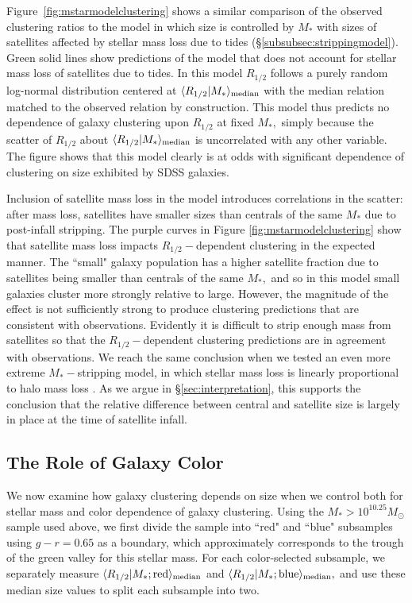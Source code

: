 \documentclass[usenatbib,usegraphicx,letterpaper]{mn2e}
\newcommand{\rhalf}{R_{1/2}}
\newcommand{\mstar}{M_{\ast}}
\newcommand{\median}[2]{\langle{#1}\vert{#2}\rangle_{\rm median}}
\newcommand{\msun}{M_\odot}
\begin{document}
Figure~\ref{fig:mstarmodelclustering} shows a similar comparison of the observed clustering ratios to the model
in which size is controlled by $\mstar$ with sizes of satellites affected by stellar mass loss due to tides (\S\ref{subsubsec:strippingmodel}). Green solid lines show predictions of the model that does not account for stellar
mass loss of satellites due to tides. In this model $\rhalf$ follows a purely random log-normal distribution centered at $\median{\rhalf}{\mstar}$ with the median relation matched to the observed relation by construction.  This model thus predicts no dependence of galaxy clustering upon $\rhalf$ at fixed $\mstar,$ simply because the scatter of $\rhalf$ about $\median{\rhalf}{\mstar}$ is uncorrelated with any other variable. The figure shows that this model clearly is at odds with significant dependence of clustering on size exhibited by SDSS galaxies.

Inclusion of satellite mass loss in the model introduces correlations in the scatter: after mass loss, satellites have smaller sizes than centrals of the same $\mstar$ due to post-infall stripping.
The purple curves in Figure \ref{fig:mstarmodelclustering} show that satellite mass loss impacts $\rhalf-$dependent clustering in the expected manner. The ``small" galaxy population has a higher satellite fraction due to satellites being smaller than centrals of the same $\mstar,$ and so in this model small galaxies cluster more strongly relative to large. However, the magnitude of the effect is not sufficiently strong  to produce clustering predictions that are consistent with observations. Evidently it is difficult to strip enough mass from satellites so that the $\rhalf-$dependent clustering predictions are in agreement with observations.  We reach the same conclusion when we tested an even more extreme $\mstar-$stripping model, in which stellar mass loss is linearly proportional to halo mass loss \citep[][Model 1]{watson_etal12}.
As we argue in \S\ref{sec:interpretation}, this supports the conclusion that the relative difference between central and satellite size is largely in place at the time of satellite infall.

\subsection{The Role of Galaxy Color}
\label{subsec:colormorph}

We now examine how galaxy clustering depends on size when we control both for stellar mass and color dependence of galaxy clustering. Using the $\mstar>10^{10.25}\msun$ sample used above, we first divide the sample into ``red" and ``blue" subsamples using $g-r=0.65$ as a boundary, which approximately corresponds to the trough of the green valley for this stellar mass. For each color-selected subsample, we separately measure $\median{\rhalf}{\mstar; {\rm red}}$ and $\median{\rhalf}{\mstar; {\rm blue}},$ and use these median size values to split each subsample into two.
\end{document}
